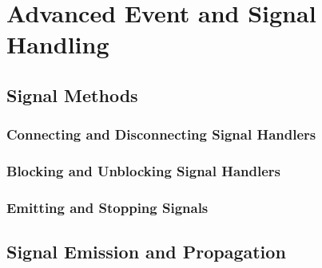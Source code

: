 \chapter{Advanced Event and Signal Handling}
\section{Signal Methods}
	\subsection{Connecting and Disconnecting Signal Handlers}
	\subsection{Blocking and Unblocking Signal Handlers}
	\subsection{Emitting and Stopping Signals}
\section{Signal Emission and Propagation}
